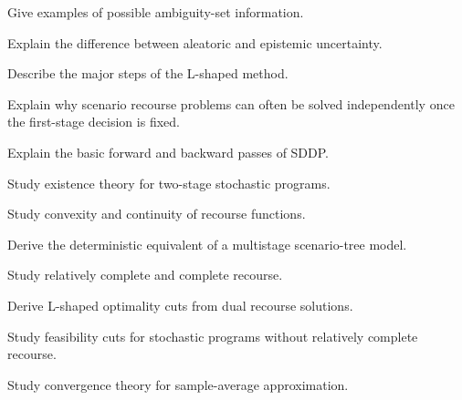 \begin{exercise}[3]
Give examples of possible ambiguity-set information.
\end{exercise}

\begin{exercise}[3]
Explain the difference between aleatoric and epistemic uncertainty.
\end{exercise}

\begin{exercise}[3]
Describe the major steps of the L-shaped method.
\end{exercise}

\begin{exercise}[3]
Explain why scenario recourse problems can often be solved independently
once the first-stage decision is fixed.
\end{exercise}

\begin{exercise}[3]
Explain the basic forward and backward passes of SDDP.
\end{exercise}

\begin{exercise}[4]
Study existence theory for two-stage stochastic programs.
\end{exercise}

\begin{exercise}[4]
Study convexity and continuity of recourse functions.
\end{exercise}

\begin{exercise}[4]
Derive the deterministic equivalent of a multistage scenario-tree model.
\end{exercise}

\begin{exercise}[4]
Study relatively complete and complete recourse.
\end{exercise}

\begin{exercise}[4]
Derive L-shaped optimality cuts from dual recourse solutions.
\end{exercise}

\begin{exercise}[4]
Study feasibility cuts for stochastic programs without relatively complete
recourse.
\end{exercise}

\begin{exercise}[4]
Study convergence theory for sample-average approximation.
\end{exercise}

